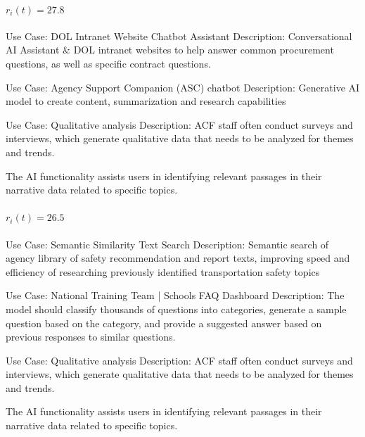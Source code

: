 \paragraph{$r_i(t) = 27.8$}
\begin{description}[style=nextline,leftmargin=1em,font=\normalfont\bfseries]
  \item[Anchor] Use Case: DOL Intranet Website Chatbot Assistant
Description: 
Conversational AI Assistant \& DOL intranet websites to help answer common procurement questions, as well as specific contract questions.
  \item[Human-judged closer] Use Case: Agency Support Companion (ASC) chatbot
Description: Generative AI model to create content, summarization and research capabilities
  \item[Human-judged farther] Use Case: Qualitative analysis
Description: ACF staff often conduct surveys and interviews, which generate qualitative data that needs to be analyzed for themes and trends.

The AI functionality assists users in identifying relevant passages in their narrative data related to specific topics.
\end{description}
\paragraph{$r_i(t) = 26.5$}
\begin{description}[style=nextline,leftmargin=1em,font=\normalfont\bfseries]
  \item[Anchor] Use Case: Semantic Similarity Text Search
Description: Semantic search of agency library of safety recommendation and report texts, improving speed and efficiency of researching previously identified transportation safety topics
  \item[Human-judged closer] Use Case: National Training Team | Schools  FAQ Dashboard
Description: The model should classify thousands of questions into categories, generate a sample question based on the category, and provide a suggested answer based on previous responses to similar questions.
  \item[Human-judged farther] Use Case: Qualitative analysis
Description: ACF staff often conduct surveys and interviews, which generate qualitative data that needs to be analyzed for themes and trends.

The AI functionality assists users in identifying relevant passages in their narrative data related to specific topics.
\end{description}
